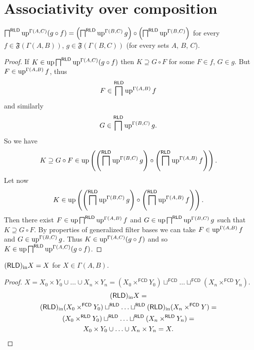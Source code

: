 \section{Associativity over composition}
\begin{lem}
\label{uparr-gamma-comp}$\bigsqcap^{\mathsf{RLD}}\operatorname{up}^{\Gamma(A,C)}(g\circ f)=\left(\bigsqcap^{\mathsf{RLD}}\operatorname{up}^{\Gamma(B,C)}g\right)\circ\left(\bigsqcap^{\mathsf{RLD}}\operatorname{up}^{\Gamma(B,C)}\right)$
for every $f\in\mathfrak{F}(\Gamma(A,B))$, $g\in\mathfrak{F}(\Gamma(B,C))$
(for every sets $A$, $B$, $C$).\end{lem}
\begin{proof}
If $K\in\operatorname{up}\bigsqcap^{\mathsf{RLD}}\operatorname{up}^{\Gamma(A,C)}(g\circ f)$ then
$K\supseteq G\circ F$ for some $F\in f$, $G\in g$. But $F\in\operatorname{up}^{\Gamma(A,B)}f$,
thus 
\[
F\in\bigsqcap^{\mathsf{RLD}}\operatorname{up}^{\Gamma(A,B)}f
\]
and similarly 
\[
G\in\bigsqcap^{\mathsf{RLD}}\operatorname{up}^{\Gamma(B,C)}g.
\]
So we have 
\[
K\supseteq G\circ F\in\operatorname{up}\left(\left(\bigsqcap^{\mathsf{RLD}}\operatorname{up}^{\Gamma(B,C)}g\right)\circ\left(\bigsqcap^{\mathsf{RLD}}\operatorname{up}^{\Gamma(A,B)}f\right)\right).
\]
Let now 
\[
K\in\operatorname{up}\left(\left(\bigsqcap^{\mathsf{RLD}}\operatorname{up}^{\Gamma(B,C)}g\right)\circ\left(\bigsqcap^{\mathsf{RLD}}\operatorname{up}^{\Gamma(A,B)}f\right)\right).
\]
Then there exist $F\in\operatorname{up}\bigsqcap^{\mathsf{RLD}}\operatorname{up}^{\Gamma(A,B)}f$
and $G\in\operatorname{up}\bigsqcap^{\mathsf{RLD}}\operatorname{up}^{\Gamma(B,C)}g$ such that
$K\supseteq G\circ F$. By properties of generalized filter bases
we can take $F\in\operatorname{up}^{\Gamma(A,B)}f$ and $G\in\operatorname{up}^{\Gamma(B,C)}g$.
Thus $K\in\operatorname{up}^{\Gamma(A,C)}(g\circ f)$ and so $K\in\operatorname{up}\bigsqcap^{\mathsf{RLD}}\operatorname{up}^{\Gamma(A,C)}(g\circ f)$.\end{proof}
\begin{lem}
$(\mathsf{RLD})_{\mathrm{in}} X=X$ for $X\in\Gamma(A,B)$.\end{lem}
\begin{proof}
$X=X_{0}\times Y_{0}\cup\ldots\cup X_{n}\times Y_{n}=(X_{0}\times^{\mathsf{FCD}}Y_{0})\sqcup^{\mathsf{FCD}}\ldots\sqcup^{\mathsf{FCD}}(X_{n}\times^{\mathsf{FCD}}Y_{n})$.
\begin{multline*}
(\mathsf{RLD})_{\mathrm{in}} X=\\
(\mathsf{RLD})_{\mathrm{in}}(X_{0}\times^{\mathsf{FCD}}Y_{0})\sqcup^{\mathsf{RLD}}\ldots\sqcup^{\mathsf{RLD}}(\mathsf{RLD})_{\mathrm{in}}(X_{n}\times^{\mathsf{FCD}}Y)=\\
(X_{0}\times^{\mathsf{RLD}}Y_{0})\sqcup^{\mathsf{RLD}}\ldots\sqcup^{\mathsf{RLD}}(X_{n}\times^{\mathsf{RLD}}Y_{n})=\\
X_{0}\times Y_{0}\cup\ldots\cup X_{n}\times Y_{n}=X.
\end{multline*}
\end{proof}

